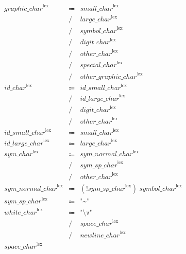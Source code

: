 \begin{align*}
    \begin{array}{rcll}
        \mathit{graphic\_char}^\mathrm{lex}
        &\Coloneq &\mathit{small\_char}^\mathrm{lex} \\
        &\mathrel{/} &\mathit{large\_char}^\mathrm{lex} \\
        &\mathrel{/} &\mathit{symbol\_char}^\mathrm{lex} \\
        &\mathrel{/} &\mathit{digit\_char}^\mathrm{lex} \\
        &\mathrel{/} &\mathit{other\_char}^\mathrm{lex} \\
        &\mathrel{/} &\mathit{special\_char}^\mathrm{lex} \\
        &\mathrel{/} &\mathit{other\_graphic\_char}^\mathrm{lex} \\
        \mathit{id\_char}^\mathrm{lex}
        &\Coloneq &\mathit{id\_small\_char}^\mathrm{lex} \\
        &\mathrel{/} &\mathit{id\_large\_char}^\mathrm{lex} \\
        &\mathrel{/} &\mathit{digit\_char}^\mathrm{lex} \\
        &\mathrel{/} &\mathit{other\_char}^\mathrm{lex} \\
        \mathit{id\_small\_char}^\mathrm{lex}
        &\Coloneq &\mathit{small\_char}^\mathrm{lex} \\
        \mathit{id\_large\_char}^\mathrm{lex}
        &\Coloneq &\mathit{large\_char}^\mathrm{lex} \\
        \mathit{sym\_char}^\mathrm{lex}
        &\Coloneq &\mathit{sym\_normal\_char}^\mathrm{lex} \\
        &\mathrel{/} &\mathit{sym\_sp\_char}^\mathrm{lex} \\
        &\mathrel{/} &\mathit{other\_char}^\mathrm{lex} \\
        \mathit{sym\_normal\_char}^\mathrm{lex}
        &\Coloneq &(\mathop{!} \mathit{sym\_sp\_char}^\mathrm{lex})\; \mathit{symbol\_char}^\mathrm{lex} \\
        \mathit{sym\_sp\_char}^\mathrm{lex}
        &\Coloneq &\texttt{"\textasciitilde"} \\
        \mathit{white\_char}^\mathrm{lex}
        &\Coloneq &\texttt{"\textbackslash v"} \\
        &\mathrel{/} &\mathit{space\_char}^\mathrm{lex} \\
        &\mathrel{/} &\mathit{newline\_char}^\mathrm{lex} \\
        \mathit{space\_char}^\mathrm{lex}

\end{array}
\end{align*}
